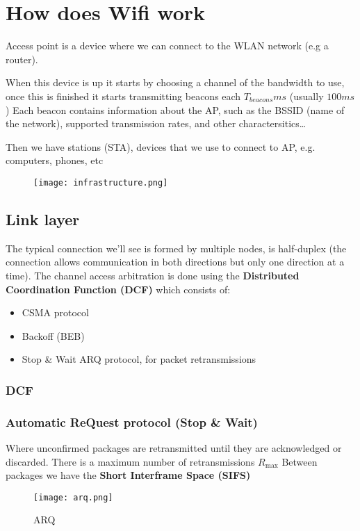 \chapter{How does Wifi work}
Access point is a device where we can connect to 
the WLAN network (e.g a router).

When this device is up it starts by choosing a channel
of the bandwidth to use, once this is finished it starts 
transmitting beacons each $T_{beacons}ms$ (usually $100ms$)
Each beacon contains information about the AP, such as the 
BSSID (name of the network), supported transmission rates,
and other charactersitics\dots

Then we have stations (STA), devices that we use to connect
to AP, e.g. computers, phones, etc

\begin{figure}[htbp]
    \centering
    \texttt{[image: infrastructure.png]}
    \label{infrastructure}
\end{figure}
\section{Link layer}
The typical connection we'll see is formed by multiple nodes,
is half-duplex (the connection allows communication in both
directions but only one direction at a time).
The channel access arbitration is done using the 
\textbf{Distributed Coordination Function (DCF)} which consists
of:
\begin{itemize}
    \item CSMA protocol
    \item Backoff (BEB)
    \item Stop \& Wait ARQ protocol, for packet retransmissions
\end{itemize}
\subsection{DCF}
\subsection{Automatic ReQuest protocol (Stop \& Wait)}
Where unconfirmed packages are retransmitted until they are 
acknowledged or discarded. There is a maximum number of retransmissions $R_{\max}$
Between packages we have the \textbf{Short Interframe Space (SIFS)}
\begin{figure}[htbp]
    \centering
    \texttt{[image: arq.png]}
    \caption{ARQ}
    \label{ARQ}
\end{figure}